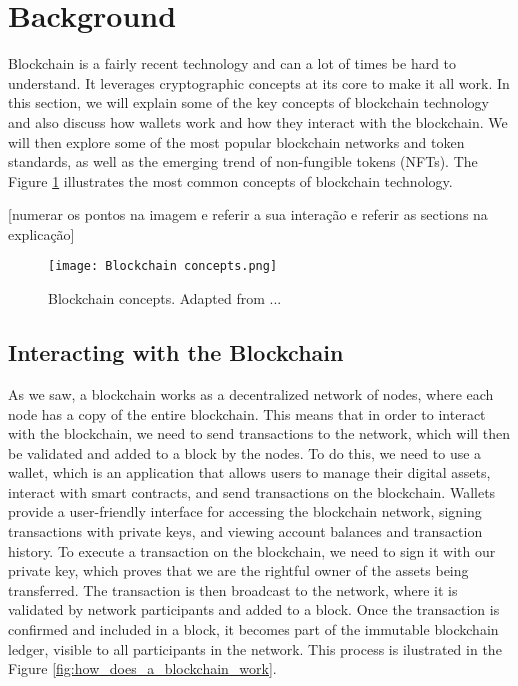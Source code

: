 \section{Background}
\label{sec:background}

Blockchain is a fairly recent technology and can a lot of times be hard to understand. It leverages cryptographic concepts at its core to make it all work. In this section, we will explain some of the key concepts of blockchain technology and also discuss how wallets work and how they interact with the blockchain. We will then explore some of the most popular blockchain networks and token standards, as well as the emerging trend of non-fungible tokens (NFTs). The Figure \ref{fig:blockchain_concepts} illustrates the most common concepts of blockchain technology.

    [numerar os pontos na imagem e referir a sua interação e referir as sections na explicação]

\begin{figure}[H]
    \texttt{[image: Blockchain concepts.png]}
    \caption[Blockchain concepts]{Blockchain concepts. Adapted from ...}
    \label{fig:blockchain_concepts}
\end{figure}

\subsection{Interacting with the Blockchain}
\label{subsec:interacting_with_the_blockchain}

As we saw, a blockchain works as a decentralized network of nodes, where each node has a copy of the entire blockchain. This means that in order to interact with the blockchain, we need to send transactions to the network, which will then be validated and added to a block by the nodes. To do this, we need to use a wallet, which is an application that allows users to manage their digital assets, interact with smart contracts, and send transactions on the blockchain.
Wallets provide a user-friendly interface for accessing the blockchain network, signing transactions with private keys, and viewing account balances and transaction history. To execute a transaction on the blockchain, we need to sign it with our private key, which proves that we are the rightful owner of the assets being transferred. The transaction is then broadcast to the network, where it is validated by network participants and added to a block. Once the transaction is confirmed and included in a block, it becomes part of the immutable blockchain ledger, visible to all participants in the network. This process is ilustrated in the Figure \ref{fig:how_does_a_blockchain_work}.

